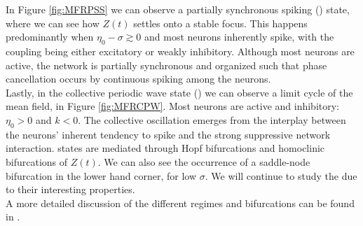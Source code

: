 In Figure \ref{fig:MFRPSS} we can observe a partially synchronous spiking (\PSS) state, where we can see how $Z(t)$ settles onto a stable focus. This happens predominantly when $\eta_0 - \sigma \gtrsim 0$ and most neurons inherently spike, with the coupling being either excitatory or weakly inhibitory. Although most neurons are active, the network is partially synchronous and organized such that phase cancellation occurs by continuous spiking among the neurons.\\

Lastly, in the collective periodic wave state (\CPW) we can observe a limit cycle of the mean field, in Figure \ref{fig:MFRCPW}. Most neurons are active and inhibitory: $\eta_0 > 0$ and $k < 0$. The collective oscillation emerges from the interplay between the neurons’ inherent tendency to spike and the strong suppressive network interaction. \CPW states are mediated through Hopf bifurcations and homoclinic bifurcations of $Z(t)$. We can also see the occurrence of a saddle-node bifurcation in the lower hand corner, for low $\sigma$. We will continue to study the \CPW due to their interesting properties.\\

A more detailed discussion of the different regimes and bifurcations can be found in \cite{Luke2013}.

